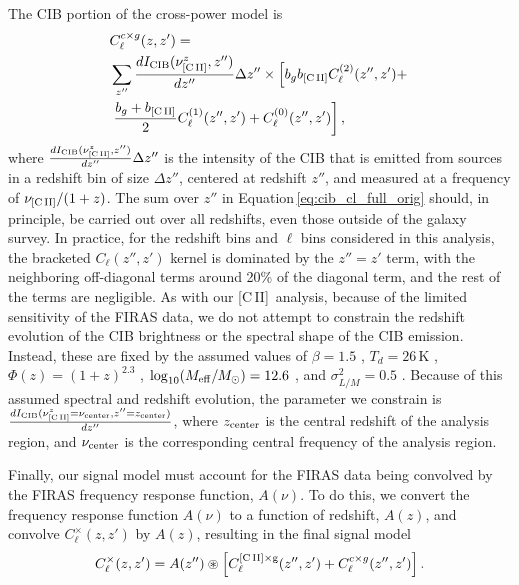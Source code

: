 \documentclass[fleqn,usenatbib]{mnras}
\newcommand{\cii}{[C{\sc\,II}]}
\begin{document}
The CIB portion of the cross-power model is
\begin{equation}\label{eq:cib_cl_full_orig}
\begin{split}
&C_{\ell}^{c \times g}(z,z') = \\
& \sum_{z''} \frac{dI_{\rm CIB}(\nu_{\rm \cii}^z,z'')}{dz''}\Delta z'' \times \left[ b_gb_{\rm \cii}C^{(2)}_{\ell}(z'',z') + \right.\\
&\left. \frac{b_g + b_{\rm \cii}}{2}C^{(1)}_{\ell}(z'',z') + C^{(0)}_{\ell}(z'',z') \right],
\end{split}
\end{equation}
where $\frac{dI_{\rm CIB}(\nu_{\rm \cii}^z,z'')}{dz''}\Delta z''$ is the intensity of the CIB that is emitted from sources in a redshift bin of size $\Delta z''$, centered at redshift $z''$, and measured at a frequency of $\nu_{\rm \cii}/(1+z)$.
The sum over $z''$ in Equation\,\ref{eq:cib_cl_full_orig} should, in principle, be carried out over all redshifts, even those outside of the galaxy survey. In practice, for the redshift bins and $\ell$ bins considered in this analysis, the bracketed $C_{\ell}(z'',z')$ kernel is dominated by the $z''= z'$ term, with the neighboring off-diagonal terms around 20\% of the diagonal term, and the rest of the terms are negligible. As with our \cii\ analysis, because of the limited sensitivity of the FIRAS data, we do not attempt to constrain the redshift evolution of the CIB brightness or the spectral shape of the CIB emission. Instead, these are fixed by the assumed values of $\beta = 1.5$ \citep{Planck2014}, $T_d=26$\,K \citep{Serra:2014pva}, $\Phi(z) = (1+z)^{2.3}$ \citep{pullen2018search}, $\log_{10}(M_{\rm eff}/M_{\odot}) = 12.6$ \citep{Planck2014, serra2016dissecting}, and $\sigma^2_{L/M}=0.5$ \citep{10.1111/j.1365-2966.2012.20510.x, Planck2014, serra2016dissecting}. Because of this assumed spectral and redshift evolution, the parameter we constrain is $\frac{dI_{\rm CIB}(\nu_{\rm \cii}^z = \nu_{\rm center} ,z'' = z_{\rm center})}{dz''}$, where $z_{\rm center}$ is the central redshift of the analysis region, and $\nu_{\rm center}$ is the corresponding central frequency of the analysis region.

Finally, our signal model must account for the FIRAS data being convolved by the FIRAS frequency response function, $A(\nu)$. To do this, we convert the frequency response function $A(\nu)$ to a function of redshift, $A(z)$, and convolve $C_{\ell}^{\times}(z,z')$ by $A(z)$, resulting in the final signal model
\begin{equation}
C_{\ell}^{\times}(z,z') = A(z'') \circledast \left[ C_{\ell}^{\rm \cii \times g}(z'',z') + C_{\ell}^{c \times g}(z'',z') \right].
\end{equation}
\end{document}
